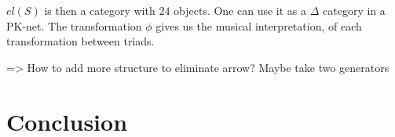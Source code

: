 \documentclass{report}
\theoremstyle{plain}
\theoremstyle{definition}
\theoremstyle{remark}
\begin{document}
$el(S)$ is then a category with $24$ objects. One can use it as a $\Delta$ category in a PK-net. The transformation $\phi$ gives us the musical interpretation, of each transformation between triads.

=> How to add more structure to eliminate arrow? Maybe take two generators





\chapter{Conclusion}
\end{document}
